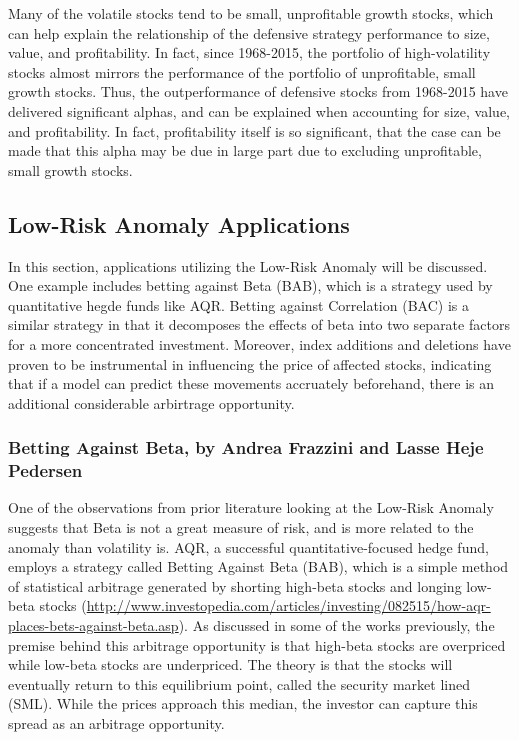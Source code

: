 \documentclass[12pt,twoside]{reedthesis}
\theoremstyle{definition}
\theoremstyle{definition}
\theoremstyle{definition}
\theoremstyle{remark}
\begin{document}
Many of the volatile stocks tend to be small, unprofitable growth
stocks, which can help explain the relationship of the defensive
strategy performance to size, value, and profitability. In fact, since
1968-2015, the portfolio of high-volatility stocks almost mirrors the
performance of the portfolio of unprofitable, small growth stocks. Thus,
the outperformance of defensive stocks from 1968-2015 have delivered
significant alphas, and can be explained when accounting for size,
value, and profitability. In fact, profitability itself is so
significant, that the case can be made that this alpha may be due in
large part due to excluding unprofitable, small growth stocks.

\subsection{Low-Risk Anomaly
Applications}\label{low-risk-anomaly-applications}

In this section, applications utilizing the Low-Risk Anomaly will be
discussed. One example includes betting against Beta (BAB), which is a
strategy used by quantitative hegde funds like AQR. Betting against
Correlation (BAC) is a similar strategy in that it decomposes the
effects of beta into two separate factors for a more concentrated
investment. Moreover, index additions and deletions have proven to be
instrumental in influencing the price of affected stocks, indicating
that if a model can predict these movements accruately beforehand, there
is an additional considerable arbirtrage opportunity.

\subsubsection{Betting Against Beta, by Andrea Frazzini and Lasse Heje
Pedersen}\label{betting-against-beta-by-andrea-frazzini-and-lasse-heje-pedersen}

One of the observations from prior literature looking at the Low-Risk
Anomaly suggests that Beta is not a great measure of risk, and is more
related to the anomaly than volatility is. AQR, a successful
quantitative-focused hedge fund, employs a strategy called Betting
Against Beta (BAB), which is a simple method of statistical arbitrage
generated by shorting high-beta stocks and longing low-beta stocks
(\url{http://www.investopedia.com/articles/investing/082515/how-aqr-places-bets-against-beta.asp}).
As discussed in some of the works previously, the premise behind this
arbitrage opportunity is that high-beta stocks are overpriced while
low-beta stocks are underpriced. The theory is that the stocks will
eventually return to this equilibrium point, called the security market
lined (SML). While the prices approach this median, the investor can
capture this spread as an arbitrage opportunity.
\end{document}
